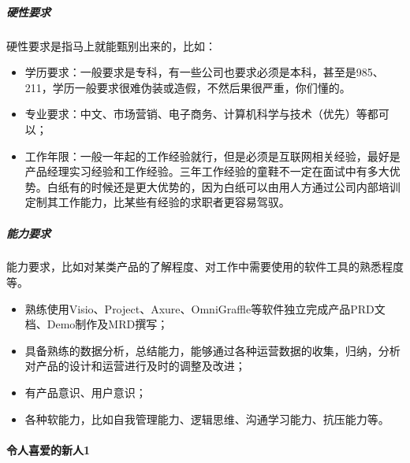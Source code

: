 \documentclass[letterpaper,10pt,english]{sphinxmanual}
\begin{document}
\subparagraph{硬性要求}
\label{\detokenize{chapter_interview/require:id2}}
硬性要求是指马上就能甄别出来的，比如：
\begin{itemize}
\item {} 
学历要求：一般要求是专科，有一些公司也要求必须是本科，甚至是985、211，学历一般要求很难伪装或造假，不然后果很严重，你们懂的。

\item {} 
专业要求：中文、市场营销、电子商务、计算机科学与技术（优先）等都可以；

\item {} 
工作年限：一般一年起的工作经验就行，但是必须是互联网相关经验，最好是产品经理实习经验和工作经验。三年工作经验的童鞋不一定在面试中有多大优势。白纸有的时候还是更大优势的，因为白纸可以由用人方通过公司内部培训定制其工作能力，比某些有经验的求职者更容易驾驭。

\end{itemize}


\subparagraph{能力要求}
\label{\detokenize{chapter_interview/require:id3}}
能力要求，比如对某类产品的了解程度、对工作中需要使用的软件工具的熟悉程度等。
\begin{itemize}
\item {} 
熟练使用Visio、Project、Axure、OmniGraffle等软件独立完成产品PRD文档、Demo制作及MRD撰写；

\item {} 
具备熟练的数据分析，总结能力，能够通过各种运营数据的收集，归纳，分析对产品的设计和运营进行及时的调整及改进；

\item {} 
有产品意识、用户意识；

\item {} 
各种软能力，比如自我管理能力、逻辑思维、沟通学习能力、抗压能力等。%
\begin{footnote}[837]\sphinxAtStartFootnote
{}
%
\end{footnote}

\end{itemize}


\paragraph{令人喜爱的新人1\sphinxfootnotemark[838]}
\label{\detokenize{chapter_interview/new_like:id1}}\label{\detokenize{chapter_interview/new_like::doc}}%
\begin{footnotetext}[838]\sphinxAtStartFootnote
{}
%
\end{footnotetext}\ignorespaces 
\end{document}
